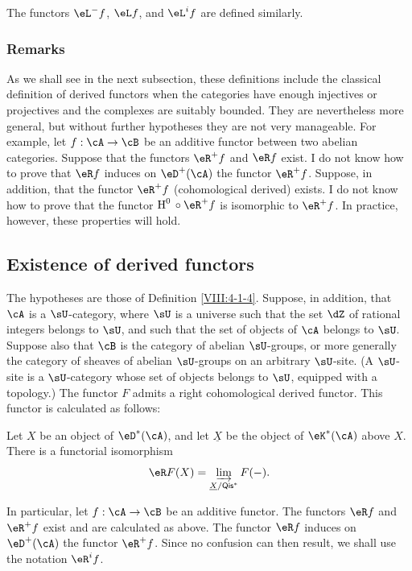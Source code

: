 The functors $\eL^- f$, $\eL f$, and $\eL^i f$ are defined similarly.

\subsubsection{Remarks}\label{VIII:4-1-6}

As we shall see in the next subsection, these definitions include the
classical definition of derived functors when the categories have enough
injectives or projectives and the complexes are suitably bounded. They are
nevertheless more general, but without further hypotheses they are not
very manageable. For example, let $f:\cA\to \cB$ be an additive functor
between two abelian categories. Suppose that the functors $\eR^+ f$ and
$\eR f$ exist. I do not know how to prove that $\eR f$ induces on
$\eD^+(\cA)$ the functor $\eR^+ f$. Suppose, in addition, that the functor
$\eR^+ f$ (cohomological derived) exists. I do not know how to prove that
the functor $\h^0{}\circ \eR^+ f$ is isomorphic to $\eR^+ f$. In practice,
however, these properties will hold.

\subsection{Existence of derived functors}\label{VIII:4-2}

\begin{proposition}\label{VIII:4-2-1}
The hypotheses are those of Definition \ref{VIII:4-1-4}. Suppose, in
addition, that $\cA$ is a $\sU$-category, where $\sU$ is a universe such
that the set $\dZ$ of rational integers belongs to $\sU$, and such that
the set of objects of $\cA$ belongs to $\sU$. Suppose also that $\cB$ is
the category of abelian $\sU$-groups, or more generally the category of
sheaves of abelian $\sU$-groups on an arbitrary $\sU$-site. (A $\sU$-site
is a $\sU$-category whose set of objects belongs to $\sU$, equipped with
a topology.) The functor $F$ admits a right cohomological derived functor.
This functor is calculated as follows:

Let $X$ be an object of $\eD^\ast(\cA)$, and let $\underline X$ be the
object of $\eK^\ast(\cA)$ above $X$. There is a functorial isomorphism
\[
  \eR F(X) = \varinjlim_{\underline X/\mathsf{Qis}^\ast} F(-) \text{.}
\]
\end{proposition}

In particular, let $f:\cA\to \cB$ be an additive functor. The functors
$\eR f$ and $\eR^+ f$ exist and are calculated as above. The functor
$\eR f$ induces on $\eD^+(\cA)$ the functor $\eR^+ f$. Since no confusion
can then result, we shall use the notation $\eR^i f$.

